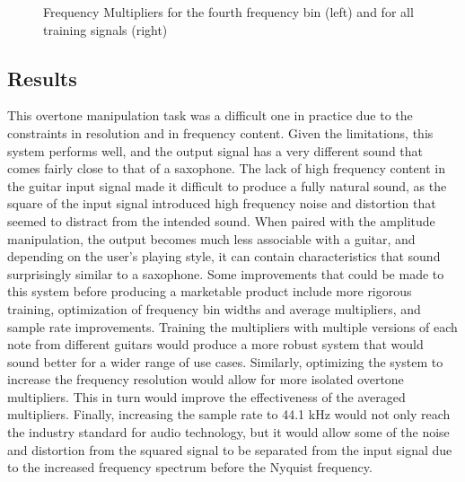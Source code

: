 \documentclass[12pt]{article}
\begin{document}
\begin{figure}[h]
\caption{Frequency Multipliers for the fourth frequency bin (left) and for all training signals (right)}
\centering
\end{figure}


\subsection {Results}
This overtone manipulation task was a difficult one in practice due to the constraints in resolution and in frequency content. Given the limitations, this system performs well, and the output signal has a very different sound that comes fairly close to that of a saxophone. The lack of high frequency content in the guitar input signal made it difficult to produce a fully natural sound, as the square of the input signal introduced high frequency noise and distortion that seemed to distract from the intended sound. When paired with the amplitude manipulation, the output becomes much less associable with a guitar, and depending on the user's playing style, it can contain characteristics that sound surprisingly similar to a saxophone. 
\newline\newline
Some improvements that could be made to this system before producing a marketable product include more rigorous training, optimization of frequency bin widths and average multipliers, and sample rate improvements. Training the multipliers with multiple versions of each note from different guitars would produce a more robust system that would sound better for a wider range of use cases. Similarly, optimizing the system to increase the frequency resolution would allow for more isolated overtone multipliers. This in turn would improve the effectiveness of the averaged multipliers. Finally, increasing the sample rate to 44.1 kHz would not only reach the industry standard for audio technology, but it would allow some of the noise and distortion from the squared signal to be separated from the input signal due to the increased frequency spectrum before the Nyquist frequency.
\end{document}
